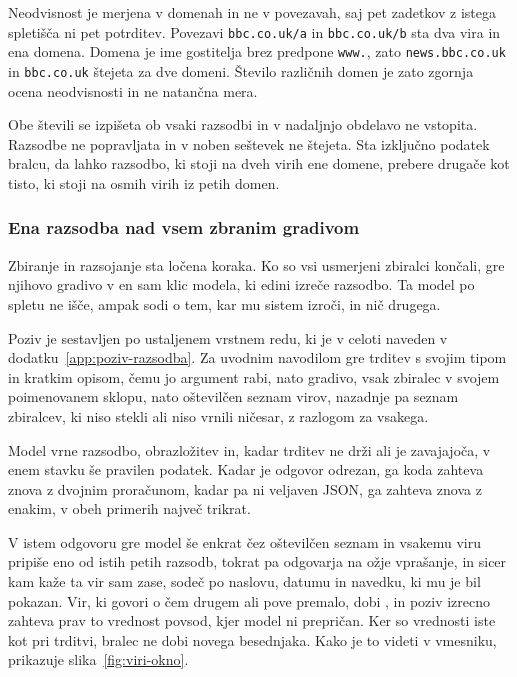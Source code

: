 \documentclass[a4paper, 12pt]{book}
\begin{document}
Neodvisnost je merjena v domenah in ne v povezavah, saj pet zadetkov z istega
spletišča ni pet potrditev. Povezavi \texttt{bbc.co.uk/a} in \texttt{bbc.co.uk/b}
sta dva vira in ena domena.  Domena je ime gostitelja brez predpone \texttt{www.}, zato \texttt{news.bbc.co.uk} in \texttt{bbc.co.uk} štejeta za dve domeni. Število različnih domen je zato zgornja ocena neodvisnosti in ne natančna mera. 

Obe števili se izpišeta ob vsaki razsodbi in v nadaljnjo obdelavo ne vstopita.
Razsodbe ne popravljata in v noben seštevek ne štejeta. Sta izključno podatek
bralcu, da lahko razsodbo, ki stoji na dveh virih ene domene, prebere drugače
kot tisto, ki stoji na osmih virih iz petih domen.

\subsubsection{Ena razsodba nad vsem zbranim gradivom}
\label{ssec:razsojanje}

Zbiranje in razsojanje sta ločena koraka. Ko so vsi usmerjeni zbiralci končali,
gre njihovo gradivo v en sam klic modela, ki edini izreče razsodbo. Ta model po
spletu ne išče, ampak sodi o tem, kar mu sistem izroči, in nič drugega.

Poziv je sestavljen po ustaljenem vrstnem redu, ki je v celoti naveden v
dodatku~\ref{app:poziv-razsodba}. Za uvodnim navodilom gre trditev s svojim
tipom in kratkim opisom, čemu jo argument rabi, nato gradivo, vsak zbiralec v
svojem poimenovanem sklopu, nato oštevilčen seznam virov, nazadnje pa seznam
zbiralcev, ki niso stekli ali niso vrnili ničesar, z razlogom za vsakega.

Model vrne razsodbo, obrazložitev in, kadar trditev ne drži ali je zavajajoča,
v enem stavku še pravilen podatek. Kadar je odgovor odrezan, ga koda zahteva
znova z dvojnim proračunom, kadar pa ni veljaven JSON, ga zahteva znova z
enakim, v obeh primerih največ trikrat. 

V istem odgovoru gre model še enkrat čez oštevilčen seznam in vsakemu viru
pripiše eno od istih petih razsodb, tokrat pa odgovarja na ožje vprašanje, in
sicer kam kaže ta vir sam zase, sodeč po naslovu, datumu in navedku, ki mu je
bil pokazan. Vir, ki govori o čem drugem ali pove premalo, dobi
, in poziv izrecno zahteva prav to vrednost povsod, kjer
model ni prepričan. Ker so vrednosti iste kot pri trditvi, bralec ne dobi novega
besednjaka. Kako je to videti v vmesniku, prikazuje
slika~\ref{fig:viri-okno}.
\end{document}
